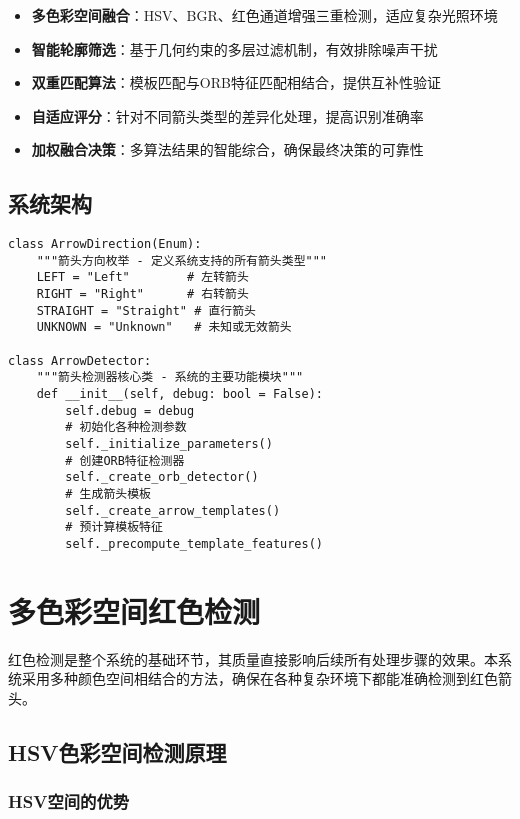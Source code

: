 \documentclass[12pt]{article}
\begin{document}
\begin{itemize}
    \item \textbf{多色彩空间融合}：HSV、BGR、红色通道增强三重检测，适应复杂光照环境
    \item \textbf{智能轮廓筛选}：基于几何约束的多层过滤机制，有效排除噪声干扰
    \item \textbf{双重匹配算法}：模板匹配与ORB特征匹配相结合，提供互补性验证
    \item \textbf{自适应评分}：针对不同箭头类型的差异化处理，提高识别准确率
    \item \textbf{加权融合决策}：多算法结果的智能综合，确保最终决策的可靠性
\end{itemize}

\subsection{系统架构}

\begin{lstlisting}[caption=系统核心类设计]
class ArrowDirection(Enum):
    """箭头方向枚举 - 定义系统支持的所有箭头类型"""
    LEFT = "Left"        # 左转箭头
    RIGHT = "Right"      # 右转箭头
    STRAIGHT = "Straight" # 直行箭头
    UNKNOWN = "Unknown"   # 未知或无效箭头

class ArrowDetector:
    """箭头检测器核心类 - 系统的主要功能模块"""
    def __init__(self, debug: bool = False):
        self.debug = debug
        # 初始化各种检测参数
        self._initialize_parameters()
        # 创建ORB特征检测器
        self._create_orb_detector()
        # 生成箭头模板
        self._create_arrow_templates()
        # 预计算模板特征
        self._precompute_template_features()
\end{lstlisting}

\section{多色彩空间红色检测}

红色检测是整个系统的基础环节，其质量直接影响后续所有处理步骤的效果。本系统采用多种颜色空间相结合的方法，确保在各种复杂环境下都能准确检测到红色箭头。

\subsection{HSV色彩空间检测原理}

\subsubsection{HSV空间的优势}
\end{document}
